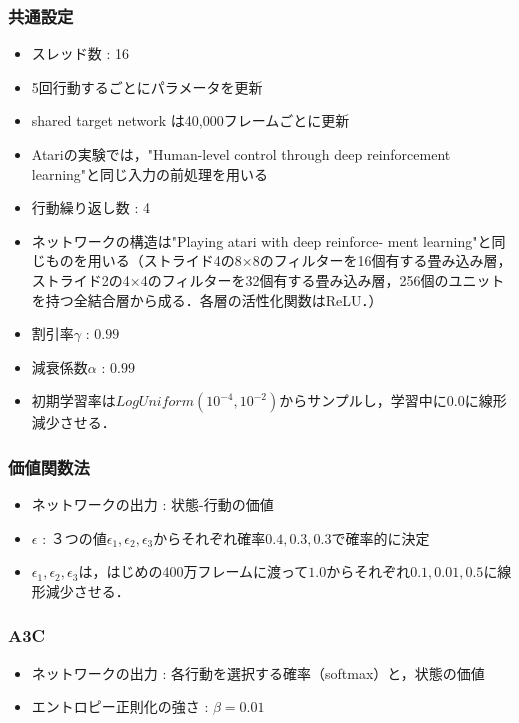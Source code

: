 \documentclass{jarticle}
\begin{document}
\subsubsection{共通設定}
\begin{itemize}
	\item スレッド数 : 16
	\item 5回行動するごとにパラメータを更新
	\item shared target network は40,000フレームごとに更新
	\item Atariの実験では，"Human-level control through deep reinforcement learning"と同じ入力の前処理を用いる
	\item 行動繰り返し数 : 4
	\item ネットワークの構造は"Playing atari with deep reinforce- ment learning"と同じものを用いる（ストライド4の8×8のフィルターを16個有する畳み込み層，ストライド2の4×4のフィルターを32個有する畳み込み層，256個のユニットを持つ全結合層から成る．各層の活性化関数はReLU．）
	\item 割引率$\gamma$ : $0.99$
	\item 減衰係数$\alpha$ : $0.99$
	\item 初期学習率は$LogUniform(10^{-4},10^{-2})$からサンプルし，学習中に$0.0$に線形減少させる．
\end{itemize}

\subsubsection{価値関数法}
\begin{itemize}
	\item ネットワークの出力 : 状態-行動の価値
	\item $\epsilon$ : ３つの値$\epsilon_1,\epsilon_2,\epsilon_3$からそれぞれ確率$0.4,0.3,0.3$で確率的に決定
	\item $\epsilon_1,\epsilon_2,\epsilon_3$は，はじめの400万フレームに渡って$1.0$からそれぞれ$0.1,0.01,0.5$に線形減少させる．
\end{itemize}

\subsubsection{A3C}
\begin{itemize}
	\item ネットワークの出力 : 各行動を選択する確率（softmax）と，状態の価値
	\item エントロピー正則化の強さ : $\beta=0.01$
\end{itemize}
\end{document}
